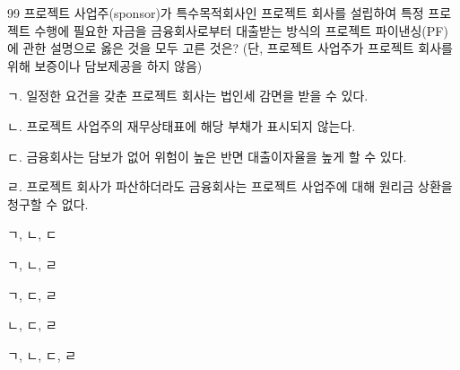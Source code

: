 \begin{question}{99}
프로젝트 사업주(sponsor)가 특수목적회사인 프로젝트 회사를 설립하여 특정 프로젝트 수행에 필요한 자금을 금융회사로부터 대출받는 방식의 프로젝트 파이낸싱(PF)에 관한 설명으로 옳은 것을 모두 고른 것은? (단, 프로젝트 사업주가 프로젝트 회사를 위해 보증이나 담보제공을 하지 않음)
\begin{framedtext}
ㄱ. 일정한 요건을 갖춘 프로젝트 회사는 법인세 감면을 받을 수 있다. \par
ㄴ. 프로젝트 사업주의 재무상태표에 해당 부채가 표시되지 않는다. \par
ㄷ. 금융회사는 담보가 없어 위험이 높은 반면 대출이자율을 높게 할 수 있다. \par
ㄹ. 프로젝트 회사가 파산하더라도 금융회사는 프로젝트 사업주에 대해 원리금 상환을 청구할 수 없다. \par
\end{framedtext}
\begin{choices}
  \item ㄱ, ㄴ, ㄷ
  \item ㄱ, ㄴ, ㄹ
  \item ㄱ, ㄷ, ㄹ
  \item ㄴ, ㄷ, ㄹ
  \item ㄱ, ㄴ, ㄷ, ㄹ
\end{choices}
\end{question}
